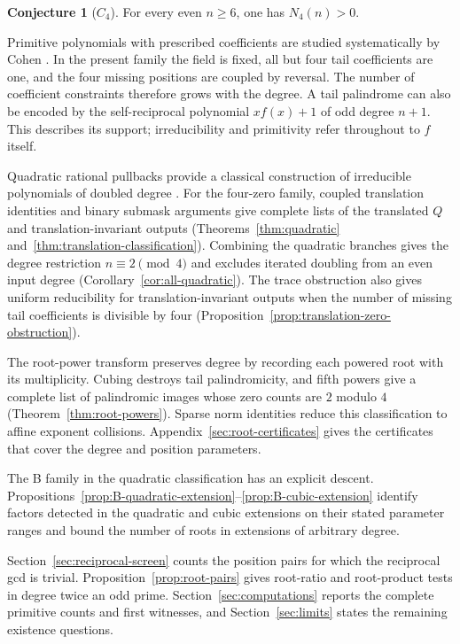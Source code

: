\documentclass[11pt]{article}
\theoremstyle{definition}
\newtheorem{conjecture}[proposition]{Conjecture}
\theoremstyle{remark}
\begin{document}
\begin{conjecture}[$C_4$]\label{conj:C4}
For every even $n\ge6$, one has $N_4(n)>0$.
\end{conjecture}

Primitive polynomials with prescribed coefficients are studied systematically
by Cohen \cite{Coh06}. In the present family the field is fixed, all but four
tail coefficients are one, and the four missing positions are coupled by
reversal. The number of coefficient constraints therefore grows with the
degree. A tail palindrome can also be encoded by the self-reciprocal
polynomial $xf(x)+1$ of odd degree $n+1$. This describes its support;
irreducibility and primitivity refer throughout to $f$ itself.

Quadratic rational pullbacks provide a classical construction of
irreducible polynomials of doubled degree \cite{MP17}.
For the four-zero family, coupled translation identities and binary
submask arguments give complete lists of the translated $Q$ and
translation-invariant outputs
(Theorems~\ref{thm:quadratic} and~\ref{thm:translation-classification}).
Combining the quadratic branches gives the degree restriction
$n\equiv2\pmod4$ and excludes iterated doubling from an even input
degree (Corollary~\ref{cor:all-quadratic}). The trace obstruction
also gives uniform reducibility for translation-invariant outputs
when the number of missing tail coefficients is divisible by four
(Proposition~\ref{prop:translation-zero-obstruction}).

The root-power transform preserves degree by recording each
powered root with its multiplicity. Cubing destroys tail
palindromicity, and fifth powers
give a complete list of palindromic images whose zero counts are
$2$ modulo $4$ (Theorem~\ref{thm:root-powers}). Sparse norm
identities reduce this classification to affine exponent collisions.
Appendix~\ref{sec:root-certificates} gives the certificates that
cover the degree and position parameters.

The B family in the quadratic classification has an explicit
descent. Propositions~\ref{prop:B-quadratic-extension}--\ref{prop:B-cubic-extension}
identify factors detected in the quadratic and cubic extensions
on their stated parameter ranges and bound the number of roots
in extensions of arbitrary degree.

Section~\ref{sec:reciprocal-screen} counts the position pairs for
which the reciprocal gcd is trivial.
Proposition~\ref{prop:root-pairs} gives root-ratio and root-product
tests in degree twice an odd prime. Section~\ref{sec:computations}
reports the complete primitive counts and first witnesses, and
Section~\ref{sec:limits} states the remaining existence questions.
\end{document}
